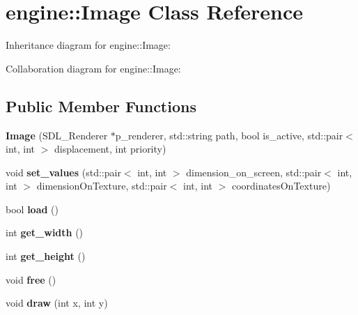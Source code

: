 \hypertarget{classengine_1_1_image}{}\section{engine\+:\+:Image Class Reference}
\label{classengine_1_1_image}


Inheritance diagram for engine\+:\+:Image\+:


Collaboration diagram for engine\+:\+:Image\+:
\subsection*{Public Member Functions}
\begin{DoxyCompactItemize}
\item 
{\bfseries Image} (S\+D\+L\+\_\+\+Renderer $\ast$p\+\_\+renderer, std\+::string path, bool is\+\_\+active, std\+::pair$<$ int, int $>$ displacement, int priority)\hypertarget{classengine_1_1_image_aa3429cf7f78e43a8c28a536f6849716c}{}\label{classengine_1_1_image_aa3429cf7f78e43a8c28a536f6849716c}

\item 
void {\bfseries set\+\_\+values} (std\+::pair$<$ int, int $>$ dimension\+\_\+on\+\_\+screen, std\+::pair$<$ int, int $>$ dimension\+On\+Texture, std\+::pair$<$ int, int $>$ coordinates\+On\+Texture)\hypertarget{classengine_1_1_image_aa0ed04e99b416fb5780f0c7ceb99f843}{}\label{classengine_1_1_image_aa0ed04e99b416fb5780f0c7ceb99f843}

\item 
bool {\bfseries load} ()\hypertarget{classengine_1_1_image_a1a393960f7402515428bd982c32f59af}{}\label{classengine_1_1_image_a1a393960f7402515428bd982c32f59af}

\item 
int {\bfseries get\+\_\+width} ()\hypertarget{classengine_1_1_image_a4eeafefc0bae9658ffe8877c5cf681e7}{}\label{classengine_1_1_image_a4eeafefc0bae9658ffe8877c5cf681e7}

\item 
int {\bfseries get\+\_\+height} ()\hypertarget{classengine_1_1_image_a5082f1fdc63e6bb76a105348e72e2e02}{}\label{classengine_1_1_image_a5082f1fdc63e6bb76a105348e72e2e02}

\item 
void {\bfseries free} ()\hypertarget{classengine_1_1_image_aa70272a861bcaa5297e6967c9106197f}{}\label{classengine_1_1_image_aa70272a861bcaa5297e6967c9106197f}

\item 
void {\bfseries draw} (int x, int y)\hypertarget{classengine_1_1_image_a45ce17ceb8619e732f2d09ec6d1cc1b9}{}\label{classengine_1_1_image_a45ce17ceb8619e732f2d09ec6d1cc1b9}

\end{DoxyCompactItemize}
